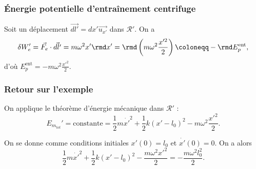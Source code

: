         \subsubsection{Énergie potentielle d'entraînement \og centrifuge\fg}
            
            Soit un déplacement $\vec{dl'}=dx'\vec{u_{x'}}$ dans $\mathcal{R}'$. On a 
            \begin{equation*}
                \delta W_{e}'=\vec{F_e}\cdot\vec{dl'}=m\omega^{2}x'\rmd x'=\rmd\left(m\omega^{2}\frac{x'^{2}}{2}\right)\coloneqq -\rmd E_p^{\text{ent}},
            \end{equation*}
            d'où $E_p^{\text{ent}}=-m\omega^{2}\frac{x'^{2}}{2}$.

        \subsubsection{Retour sur l'exemple}

            On applique le théorème d'énergie mécanique dans $\mathcal{R}'$ :
            \begin{equation*}
                E_{m_{tot}}'=\text{constante}=\frac{1}{2}m\dot{x'}^{2}+\frac{1}{2}k(x'-l_0)^{2}-m\omega^{2}\frac{x'^{2}}{2}.
            \end{equation*}

            On se donne comme conditions initiales $x'(0)=l_0$ et $\dot{x'}(0)=0$. On a alors 
            \begin{equation*}
                \boxed{
                    \frac{1}{2}m\dot{x'}^{2}+\frac{1}{2}k(x'-l_0)^{2}-\frac{m\omega^{2}x'^{2}}{2}=-\frac{m\omega^{2}l_0^{2}}{2}.
                }
            \end{equation*}

